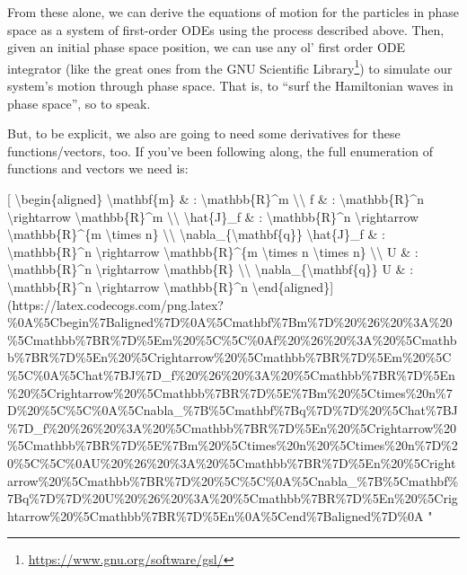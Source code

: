 \documentclass[]{article}
\renewcommand{\href}[2]{#2\footnote{\url{#1}}}
\begin{document}
From these alone, we can derive the equations of motion for the particles in
phase space as a system of first-order ODEs using the process described above.
Then, given an initial phase space position, we can use any ol' first order ODE
integrator (like the great ones from the
\href{https://www.gnu.org/software/gsl/}{GNU Scientific Library}) to simulate
our system's motion through phase space. That is, to ``surf the Hamiltonian
waves in phase space'', so to speak.

But, to be explicit, we also are going to need some derivatives for these
functions/vectors, too. If you've been following along, the full enumeration of
functions and vectors we need is:

{[} \textbackslash{}begin\{aligned\} \textbackslash{}mathbf\{m\} \& :
\textbackslash{}mathbb\{R\}\^{}m \textbackslash{}\textbackslash{} f \& :
\textbackslash{}mathbb\{R\}\^{}n \textbackslash{}rightarrow
\textbackslash{}mathbb\{R\}\^{}m \textbackslash{}\textbackslash{}
\textbackslash{}hat\{J\}\_f \& : \textbackslash{}mathbb\{R\}\^{}n
\textbackslash{}rightarrow \textbackslash{}mathbb\{R\}\^{}\{m
\textbackslash{}times n\} \textbackslash{}\textbackslash{}
\textbackslash{}nabla\_\{\textbackslash{}mathbf\{q\}\}
\textbackslash{}hat\{J\}\_f \& : \textbackslash{}mathbb\{R\}\^{}n
\textbackslash{}rightarrow \textbackslash{}mathbb\{R\}\^{}\{m
\textbackslash{}times n \textbackslash{}times n\}
\textbackslash{}\textbackslash{} U \& : \textbackslash{}mathbb\{R\}\^{}n
\textbackslash{}rightarrow \textbackslash{}mathbb\{R\}
\textbackslash{}\textbackslash{}
\textbackslash{}nabla\_\{\textbackslash{}mathbf\{q\}\} U \& :
\textbackslash{}mathbb\{R\}\^{}n \textbackslash{}rightarrow
\textbackslash{}mathbb\{R\}\^{}n
\textbackslash{}end\{aligned\}{]}(https://latex.codecogs.com/png.latex?\%0A\%5Cbegin\%7Baligned\%7D\%0A\%5Cmathbf\%7Bm\%7D\%20\%26\%20\%3A\%20\%5Cmathbb\%7BR\%7D\%5Em\%20\%5C\%5C\%0Af\%20\%26\%20\%3A\%20\%5Cmathbb\%7BR\%7D\%5En\%20\%5Crightarrow\%20\%5Cmathbb\%7BR\%7D\%5Em\%20\%5C\%5C\%0A\%5Chat\%7BJ\%7D\_f\%20\%26\%20\%3A\%20\%5Cmathbb\%7BR\%7D\%5En\%20\%5Crightarrow\%20\%5Cmathbb\%7BR\%7D\%5E\%7Bm\%20\%5Ctimes\%20n\%7D\%20\%5C\%5C\%0A\%5Cnabla\_\%7B\%5Cmathbf\%7Bq\%7D\%7D\%20\%5Chat\%7BJ\%7D\_f\%20\%26\%20\%3A\%20\%5Cmathbb\%7BR\%7D\%5En\%20\%5Crightarrow\%20\%5Cmathbb\%7BR\%7D\%5E\%7Bm\%20\%5Ctimes\%20n\%20\%5Ctimes\%20n\%7D\%20\%5C\%5C\%0AU\%20\%26\%20\%3A\%20\%5Cmathbb\%7BR\%7D\%5En\%20\%5Crightarrow\%20\%5Cmathbb\%7BR\%7D\%20\%5C\%5C\%0A\%5Cnabla\_\%7B\%5Cmathbf\%7Bq\%7D\%7D\%20U\%20\%26\%20\%3A\%20\%5Cmathbb\%7BR\%7D\%5En\%20\%5Crightarrow\%20\%5Cmathbb\%7BR\%7D\%5En\%0A\%5Cend\%7Baligned\%7D\%0A
"
\end{document}
